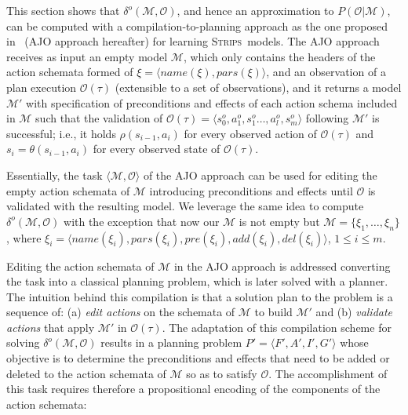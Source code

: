 \documentclass[letterpaper]{article} %
\newcommand{\tup}[1]{{\langle #1 \rangle}}
\newcommand{\strips}{\textsc{Strips}}     %
\begin{document}
This section shows that $\delta^o(\mathcal{M},\mathcal{O})$, and hence an approximation to $P(\mathcal{O}|\mathcal{M})$, can be computed with a compilation-to-planning approach as the one proposed in~\cite{aineto2018learning} (AJO approach hereafter) for learning \strips\ models. The AJO approach receives as input an empty model $\mathcal{M}$, which only contains the headers of the action schemata formed of $\xi=\tup{name(\xi),pars(\xi)}$, and an observation of a plan execution $\mathcal{O}(\tau)$ (extensible to a set of observations), and it returns a model $\mathcal{M'}$ with specification of preconditions and effects of each action schema included in $\mathcal{M}$ such that the validation of $\mathcal{O}(\tau)=\tup{s_0^o,a_1^o,s_1^o \ldots , a_l^o, s_m^o}$ following $\mathcal{M'}$ is successful; i.e., it holds $\rho(s_{i-1},a_i)$ for every observed action of $\mathcal{O}(\tau)$ and $s_i=\theta(s_{i-1},a_i)$ for every observed state of $\mathcal{O}(\tau)$.

Essentially, the task $\tup{\mathcal{M},\mathcal{O}}$ of the AJO approach can be used for editing the empty action schemata of $\mathcal{M}$ introducing preconditions and effects until $\mathcal{O}$ is validated with the resulting model. We leverage the same idea to compute $\delta^o(\mathcal{M},\mathcal{O})$ with the exception that now our $\mathcal{M}$ is not empty but $\mathcal{M}=\{\xi_1, \ldots, \xi_n\}$, where $\xi_i=\tup{name(\xi_i),pars(\xi_i),pre(\xi_i),add(\xi_i),del(\xi_i)}$, $1 \leq i \leq m$.

Editing the action schemata of $\mathcal{M}$ in the AJO approach is addressed converting the task into a classical planning problem, which is later solved with a planner. The intuition behind this compilation is that a solution plan to the problem is a sequence of: (a) \emph{edit actions} on the schemata of $\mathcal{M}$ to build $\mathcal{M'}$ and (b) \emph{validate actions} that apply $\mathcal{M'}$ in $\mathcal{O(\tau)}$. The adaptation of this compilation scheme for solving $\delta^o(\mathcal{M},\mathcal{O})$ results in a planning problem $P'=\tup{F',A',I',G'}$ whose objective is to determine the preconditions and effects that need to be added or deleted to the action schemata of $\mathcal{M}$ so as to satisfy $\mathcal{O}$. The accomplishment of this task requires therefore a propositional encoding of the components of the action schemata:
\end{document}
